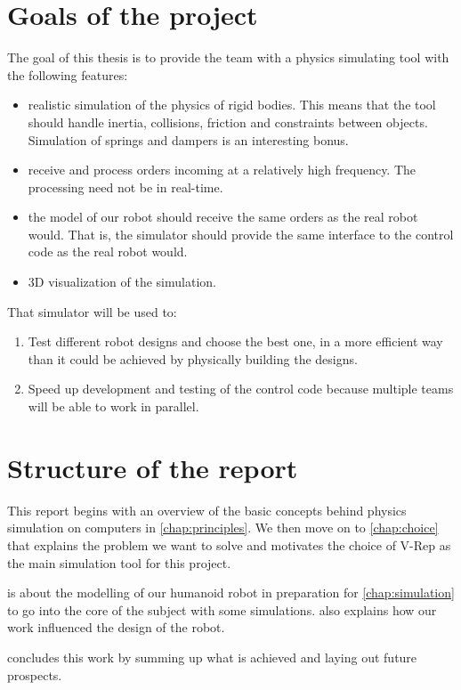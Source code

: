 \section{Goals of the project}
The goal of this thesis is to provide the team with a physics simulating tool with the following features:
\begin{itemize}
\item realistic simulation of the physics of rigid bodies. This means that the tool should handle inertia, collisions, friction and constraints between objects. Simulation of springs and dampers is an interesting bonus.
\item receive and process orders incoming at a relatively high frequency. The processing need not be in real-time.
\item the model of our robot should receive the same orders as the real robot would. That is, the simulator should provide the same interface to the control code as the real robot would. 
\item 3D visualization of the simulation.
\end{itemize}

That simulator will be used to:
\begin{enumerate}
\item Test different robot designs and choose the best one, in a more efficient way than it could be achieved by physically building the designs.
\item Speed up development and testing of the control code because multiple teams will be able to work in parallel. 
\end{enumerate}

\section{Structure of the report}
This report begins with an overview of the basic concepts behind physics simulation on computers in \cref{chap:principles}. We then move on to \cref{chap:choice} that explains the problem we want to solve and motivates the choice of V-Rep as the main simulation tool for this project.

 is about the modelling of our humanoid robot in preparation for \cref{chap:simulation} to go into the core of the subject with some simulations.  also explains how our work influenced the design of the robot.

 concludes this work by summing up what is achieved and laying out future prospects.